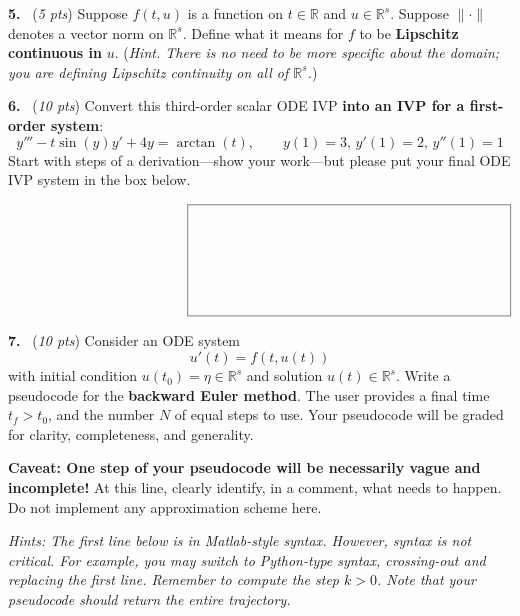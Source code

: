 \documentclass[11pt]{amsart}
\newcommand{\RR}{{\mathbb{R}}}
\newcommand{\prob}[1]{\bigskip\noindent \textbf{#1.}~}
\newcommand{\pts}[1]{(\emph{#1 pts})}
\newcommand{\probpts}[2]{\prob{#1} \pts{#2} \quad}
\begin{document}
\newpage
\probpts{5}{5}  Suppose $f(t,u)$ is a function on $t\in\RR$ and $u \in \RR^s$.  Suppose $\|\cdot\|$ denotes a vector norm on $\RR^s$.  Define what it means for $f$ to be \textbf{Lipschitz continuous in} $u$.  (\emph{Hint.  There is no need to be more specific about the domain; you are defining Lipschitz continuity on all of $\RR^s$.})
\vfill

\probpts{6}{10}  Convert this third-order scalar ODE IVP \textbf{into an IVP for a first-order system}:
    $$y''' - t \sin(y) y' + 4 y = \arctan(t), \qquad y(1) = 3, \, y'(1) = 2, \, y''(1) = 1$$ 
Start with steps of a derivation---show your work---but please put your final ODE IVP system in the box below.
\vfill

{\large
$$\hspace{2.0in} \boxed{\begin{matrix}  \phantom{sdkljfa adfda asdf asdf asdf sdakfl asdfklj asdf asdlfkj asdf} \\ \phantom{kjads} \\ \phantom{kjads} \\ \phantom{kjads} \\ \phantom{kjads} \\ \phantom{kjads} \\ \phantom{kjads} \end{matrix}}$$
}
\bigskip


\newpage
\probpts{7}{10}  Consider an ODE system
    $$u'(t) = f(t, u(t))$$
with initial condition $u(t_0)=\eta \in \RR^s$ and solution $u(t) \in \RR^s$.  Write a pseudocode for the \textbf{backward Euler method}.  The user provides a final time $t_f>t_0$, and the number $N$ of equal steps to use.  Your pseudocode will be graded for clarity, completeness, and generality.

\medskip
\noindent \textbf{Caveat:  One step of your pseudocode will be necessarily vague and incomplete!}  At this line, clearly identify, in a comment, what needs to happen.  Do not implement any approximation scheme here.

\medskip
\noindent \emph{Hints:  The first line below is in Matlab-style syntax.  However, syntax is not critical.  For example, you may switch to Python-type syntax, crossing-out and replacing the first line.  Remember to compute the step $k>0$.  Note that your pseudocode should return the entire trajectory.}

\vspace{0.5in}
\vfill
\end{document}
